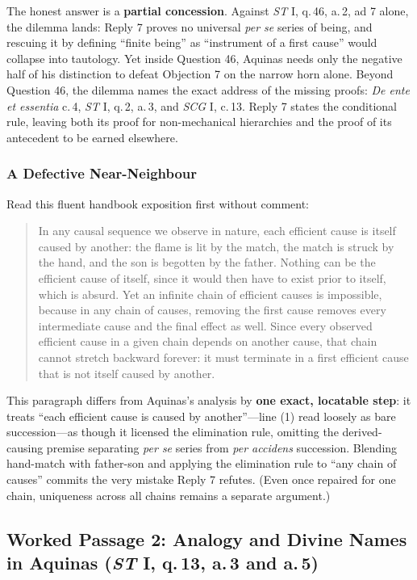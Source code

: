 The honest answer is a \textbf{partial concession}. Against \emph{ST} I, q.\,46, a.\,2, ad 7 alone, the dilemma lands: Reply 7 proves no universal \emph{per se} series of being, and rescuing it by defining ``finite being'' as ``instrument of a first cause'' would collapse into tautology. Yet inside Question 46, Aquinas needs only the negative half of his distinction to defeat Objection 7 on the narrow horn alone. Beyond Question 46, the dilemma names the exact address of the missing proofs: \emph{De ente et essentia} c.\,4, \emph{ST} I, q.\,2, a.\,3, and \emph{SCG} I, c.\,13. Reply 7 states the conditional rule, leaving both its proof for non-mechanical hierarchies and the proof of its antecedent to be earned elsewhere.

\keeppair
\subsubsection*{A Defective Near-Neighbour}

Read this fluent handbook exposition first without comment:

\begin{quote}
In any causal sequence we observe in nature, each efficient cause is itself caused by another: the flame is lit by the match, the match is struck by the hand, and the son is begotten by the father. Nothing can be the efficient cause of itself, since it would then have to exist prior to itself, which is absurd. Yet an infinite chain of efficient causes is impossible, because in any chain of causes, removing the first cause removes every intermediate cause and the final effect as well. Since every observed efficient cause in a given chain depends on another cause, that chain cannot stretch backward forever: it must terminate in a first efficient cause that is not itself caused by another.
\end{quote}

This paragraph differs from Aquinas's analysis by \textbf{one exact, locatable step}: it treats ``each efficient cause is caused by another''---line (1) read loosely as bare succession---as though it licensed the elimination rule, omitting the derived-causing premise separating \emph{per se} series from \emph{per accidens} succession. Blending hand-match with father-son and applying the elimination rule to ``any chain of causes'' commits the very mistake Reply 7 refutes. (Even once repaired for one chain, uniqueness across all chains remains a separate argument.)

\subsection{Worked Passage 2: Analogy and Divine Names in Aquinas (\emph{ST} I, q.\,13, a.\,3 and a.\,5)}

